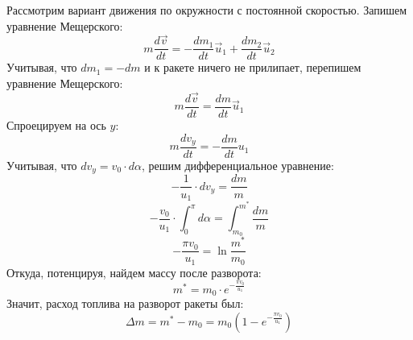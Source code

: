 \documentclass[a5paper,10pt]{article}\usepackage[usenames,dvipsnames]{color}
\begin{document}
Рассмотрим вариант движения по окружности с постоянной скоростью. Запишем уравнение Мещерского:
\begin{equation}
    m \frac{d\vec{v}}{dt}=-\frac{dm_1}{dt}{\vec{u}_1}+\frac{dm_2}{dt}{\vec{u}_2}
\end{equation}
Учитывая, что $dm_1=-dm$ и к ракете ничего не прилипает, перепишем уравнение Мещерского:
\begin{equation}
    m \frac{d\vec{v}}{dt}=\frac{dm}{dt}{\vec{u}_1}
\end{equation}
Спроецируем на ось $y$:
\begin{equation}
    m \frac{d{v}_y}{dt}=-\frac{dm}{dt}{{u}_1}    
\end{equation}
Учитывая, что $dv_y=v_0\cdot d\alpha$, решим дифференциальное уравнение:
\begin{equation}
    -\frac{1}{u_1}\cdot{d{v}_y}=\frac{dm}{m}
\end{equation}
\begin{equation}
    -\frac{v_0}{u_1}\cdot\int_0^\pi{d\alpha}=\int_{m_0}^{m^*}\frac{dm}{m}
\end{equation}
\begin{equation}
    -\frac{\pi v_0}{u_1}=\ln\frac{m^*}{m_0}
\end{equation}
Откуда, потенцируя, найдем массу после разворота:
\begin{equation}
    m^*=m_0\cdot e^{-\frac{\pi v_0}{u_1}}
\end{equation}
Значит, расход топлива на разворот ракеты был:
\begin{equation}
    \label{eq:dm1}
    \Delta m = m^*-m_0 = m_0(1-e^{-\frac{\pi v_0}{u_1}})
\end{equation}
\begin{figure}[H]
    \centering
\end{figure}
\end{document}
